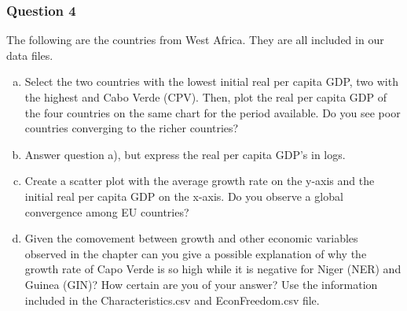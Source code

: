 \documentclass[letterpaper]{article}\usepackage[]{graphicx}\usepackage[]{color}
\numberwithin{exer}{section}
\theoremstyle{nonumberplain}
\begin{document}
\subsubsection*{Question 4}
The following are the countries from West Africa. They are all
included in our data files.
\begin{center}
\end{center}
\begin{enumerate}[a)]
  \item Select the two countries with the lowest initial real per
    capita GDP, two with the highest and Cabo Verde (CPV). Then, plot
    the real per capita GDP of the four countries on the same chart
    for the period available. Do you see poor countries converging to
    the richer countries?
  \item Answer question a), but express the real per capita GDP's in
    logs.
  \item Create a scatter plot with the average growth rate on the
    y-axis and the initial real per capita GDP on the x-axis. Do you
    observe a global convergence among EU countries?
  \item Given the comovement between growth and other economic
    variables observed in the chapter can you give a possible
    explanation of why the growth rate of Capo Verde is so high while
    it is negative for Niger (NER) and Guinea (GIN)? How certain are
    you of your answer? Use the information included in the
    Characteristics.csv and EconFreedom.csv file.
\end{enumerate}
\end{document}
